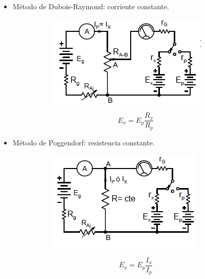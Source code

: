 \begin{itemize}
	\item Método de Dubois-Raymond: corriente constante.
\begin{figure}[H]
	\begin{minipage}{0.7\textwidth}
		\begin{figure}[H]
			\centering
			\includegraphics[width=0.7\linewidth]{ImagenesTema4/9}
			\label{fig:9}
		\end{figure}\textbf{}	
	\end{minipage}
	\begin{minipage}{0.2\textwidth}
		\[E_x=E_p\frac{R_x}{R_p}\]
	\end{minipage}
\end{figure}	
	\item Método de Poggendorf: resistencia constante.
	\begin{figure}[H]
		\begin{minipage}{0.7\textwidth}
			\begin{figure}[H]
				\centering
				\includegraphics[width=0.7\linewidth]{ImagenesTema4/10}
				\label{fig:9}
			\end{figure}\textbf{}	
		\end{minipage}
		\begin{minipage}{0.2\textwidth}
			\[E_x=E_p\frac{I_x}{I_p}\]
		\end{minipage}
	\end{figure}	

\end{itemize}
